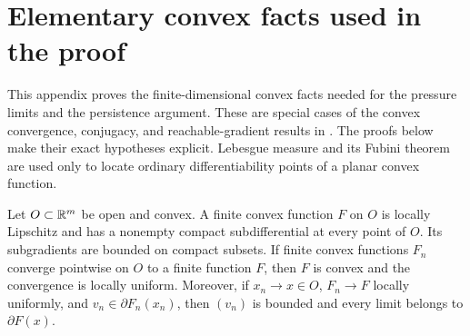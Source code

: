 \section{Elementary convex facts used in the proof}\label{app:convex-facts}
This appendix proves the finite-dimensional convex facts needed for the
pressure limits and the persistence argument. These are special cases of the
convex convergence, conjugacy, and reachable-gradient results in
\cite[Corollary~7.18 and Theorems~11.1 and 9.61]{RockafellarWets1998}. The proofs below
make their exact hypotheses explicit. Lebesgue measure and its Fubini theorem
are used only to locate ordinary differentiability points of a planar convex
function.

\begin{lemma}\label{lem:elementary-convex-convergence}
Let $O\subset\mathbb R^m$ be open and convex. A finite convex function $F$ on $O$
is locally Lipschitz and has a nonempty compact subdifferential at every
point of $O$. Its subgradients are bounded on compact subsets. If finite
convex functions $F_n$ converge pointwise on $O$ to a finite function $F$,
then $F$ is convex and the convergence is locally uniform. Moreover, if
$x_n\to x\in O$, $F_n\to F$ locally uniformly, and
$v_n\in\partial F_n(x_n)$, then $(v_n)$ is bounded and every limit belongs
to $\partial F(x)$.
\end{lemma}


